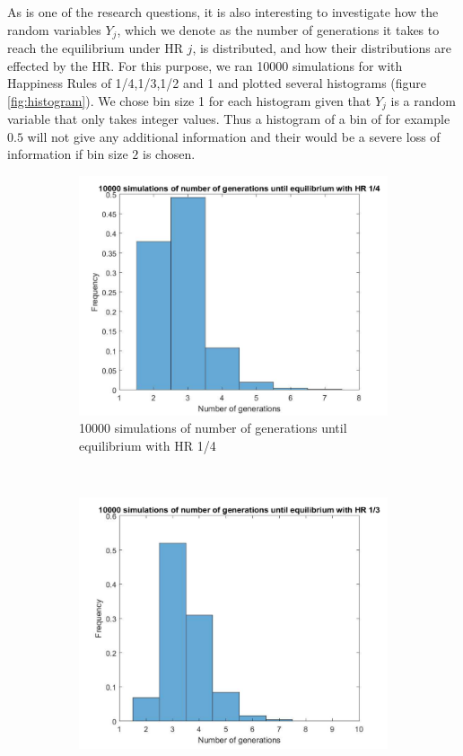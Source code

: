 As is one of the research questions, it is also interesting to investigate how the random variables $Y_j$, which we denote as the number of generations it takes to reach the equilibrium under HR $j$, is distributed, and how their distributions are effected by the HR. 
For this purpose, we ran 10000 simulations for with Happiness Rules of 1/4,1/3,1/2 and 1 and plotted several histograms (figure \ref{fig:histogram}). 
We chose bin size 1 for each histogram given that $Y_j$ is a random variable that only takes integer values. 
Thus a histogram of a bin of for example $0.5$ will not give any additional information and their would be a severe loss of information if bin size $2$ is chosen. 

\begin{figure}[H]
    \centering
    \begin{subfigure}{0.45\textwidth}
        \includegraphics[width=\textwidth]{GenormHistogramAantalgen4.pdf}
        \caption{10000 simulations of number of generations until equilibrium with HR 1/4}
        \label{hist hap 1/4}
    \end{subfigure}
	~
    \begin{subfigure}{0.45\textwidth}
        \includegraphics[width=\textwidth]{GenormHistogramAantalgen.pdf}

\end{subfigure}
\end{figure}
